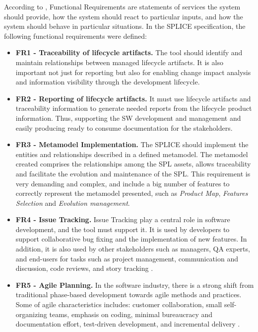 According to \cite{Sommerville2007} , Functional Requirements are statements of services the system should provide, how the system should react to particular inputs, and how the system should behave in particular situations. In the \ac{SPLICE} specification, the following functional requirements were defined:

\begin{itemize}
\item  \textbf{FR1 - Traceability of lifecycle artifacts.} The tool should identify and  maintain relationships between managed lifecycle artifacts. It is also important not just for reporting but also for enabling change impact analysis and information visibility through the development lifecycle.

\item  \textbf{FR2 - Reporting of lifecycle artifacts.} It must use lifecycle artifacts and traceability information to generate needed reports from the lifecycle product information. Thus, supporting the \ac{SW} development and management and easily producing ready to consume documentation for the stakeholders.



\item  \textbf{FR3 - Metamodel Implementation.} The \ac{SPLICE} should implement the entities and relationships described in a defined metamodel. The metamodel created comprises the relationships among the SPL assets, allows traceability and facilitate the evolution and maintenance of the SPL. This requirement is very demanding and complex, and include a big number of features to correctly represent the metamodel presented, such as \textit{Product Map}, \textit{Features Selection} and \textit{Evolution management}.


\item  \textbf{FR4 - Issue Tracking.} Issue Tracking play a central role in software development, and the tool must support it. It is used by developers to support collaborative bug fixing and the implementation of new features. In addition, it is also used by other stakeholders such as managers, QA experts, and end-users for tasks such as project management, communication and discussion, code reviews, and story tracking \citep{Baysal2013}.
 
\item  \textbf{FR5 - Agile Planning.} In the software industry, there is a strong shift from traditional phase-based development towards agile methods and practices. Some of agile characteristics includes: customer collaboration, small self-organizing teams, emphasis on coding, minimal bureaucracy and documentation effort, test-driven development, and incremental delivery \citep{Hochmuller2011}.


\end{itemize}
